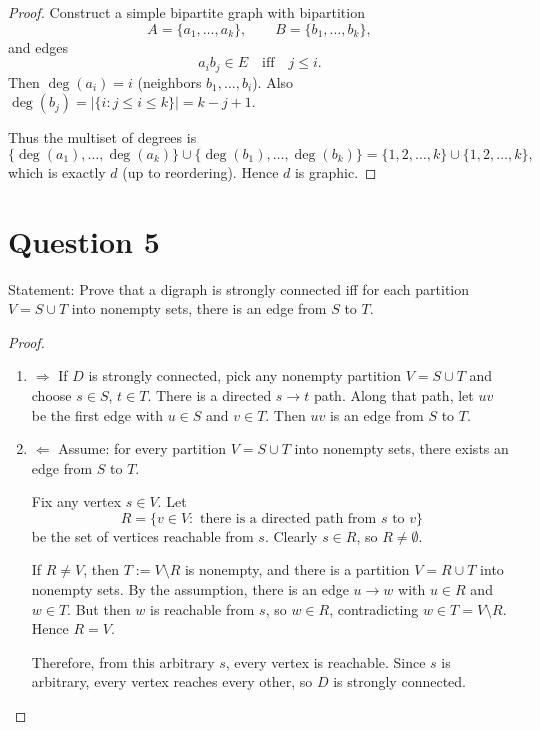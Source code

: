 \documentclass[11pt]{article}
\begin{document}
\begin{proof}
Construct a simple bipartite graph with bipartition
\[
A=\{a_1,\dots,a_k\},\qquad B=\{b_1,\dots,b_k\},
\]
and edges
\[
a_i b_j \in E \quad\text{iff}\quad j\le i.
\]
Then $\deg(a_i)=i$ (neighbors $b_1,\dots,b_i$).
Also $\deg(b_j)=|\{i: j\le i\le k\}|=k-j+1$.

Thus the multiset of degrees is
\[
\{\deg(a_1),\dots,\deg(a_k)\}\cup\{\deg(b_1),\dots,\deg(b_k)\}
=\{1,2,\dots,k\}\cup\{1,2,\dots,k\},
\]
which is exactly $d$ (up to reordering). Hence $d$ is graphic.
\end{proof}

\newpage
\section*{Question 5}
\noindent Statement: Prove that a digraph is strongly connected iff for each partition $V=S\cup T$ into nonempty sets,
there is an edge from $S$ to $T$.

\begin{proof}
~
\begin{enumerate}
    \item $\Rightarrow$ If $D$ is strongly connected, pick any nonempty partition $V=S\cup T$ and choose $s\in S$, $t\in T$.
There is a directed $s\to t$ path. Along that path, let $uv$ be the first edge with $u\in S$ and $v\in T$.
Then $uv$ is an edge from $S$ to $T$.

\item $\Leftarrow$ Assume: for every partition $V=S\cup T$ into nonempty sets,
there exists an edge from $S$ to $T$.

Fix any vertex $s\in V$. Let
\[
R=\{v\in V:\text{ there is a directed path from } s \text{ to } v\}
\]
be the set of vertices reachable from $s$. Clearly $s\in R$, so $R\neq\emptyset$.

If $R\neq V$, then $T:=V\setminus R$ is nonempty, and there is a partition $V=R\cup T$ into nonempty sets.
By the assumption, there is an edge $u\to w$ with $u\in R$ and $w\in T$.
But then $w$ is reachable from $s$, so $w\in R$,
contradicting $w\in T=V\setminus R$. Hence $R=V$.

Therefore, from this arbitrary $s$, every vertex is reachable. Since $s$ is arbitrary, every vertex reaches every other,
so $D$ is strongly connected.
\end{enumerate}
\end{proof}
\end{document}
